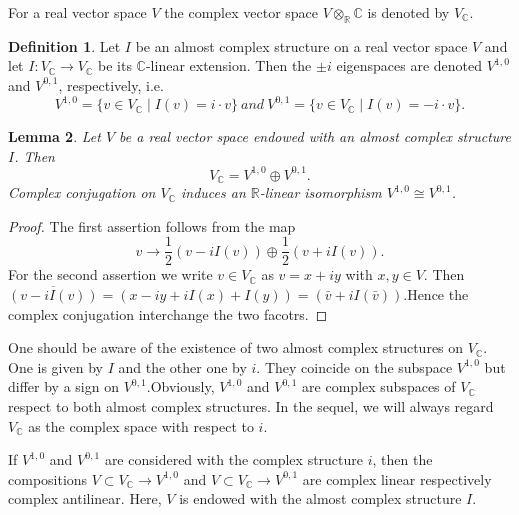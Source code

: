 \documentclass{article}
\theoremstyle{definition}
\newtheorem{definition}{Definition}[subsection]
\theoremstyle{plain}
\newtheorem{lemma}[definition]{Lemma}
\begin{document}
For a real vector space $ V $ the complex vector space $ V\otimes_{\mathbb{R}}\mathbb{C} $ is denoted by $ V_{\mathbb{C}} $.

\begin{definition}
    Let $ I $ be an almost complex structure on a real vector space $ V $ and let $ I:V_{\mathbb{C}} \rightarrow V_{\mathbb{C}} $ be its $ \mathbb{C} $-linear extension. Then the $ \pm i $ eigenspaces are denoted $ V^{1,0} $ and $ V^{0,1}  $, respectively, i.e.
    \[
        V^{1,0} =\{v\in V_{\mathbb{C}}\mid I(v)=i\cdot v\}\ and\ V^{0,1} =\{ v\in V_{\mathbb{C}}\mid I(v)=-i\cdot v\}.
    \]
\end{definition}

\begin{lemma}
    Let $ V $ be a real vector space endowed with an almost complex structure $ I $. Then 
    \[
        V_{\mathbb{C}} =V^{1,0} \oplus V^{0,1}.
    \] 
    Complex conjugation on $ V_{\mathbb{C}}  $ induces an $ \mathbb{R} $-linear isomorphism $ V^{1,0} \cong V^{0,1}  $.
\end{lemma}

\begin{proof}
    The first assertion follows from the map\[
        v\rightarrow \frac{1}{2}(v-iI(v))\oplus\frac{1}{2}(v+iI(v)).
    \] 
    For the second assertion we write $ v\in V_{\mathbb{C}}  $ as $ v=x+iy $ with $ x,y\in V $. Then $ \overline{(v-iI(v))}=(x-iy+iI(x)+I(y))=(\bar{v}+iI(\bar{v})) $.Hence the complex conjugation interchange the two facotrs.
\end{proof}

One should be aware of the existence of two almost complex structures on $ V_{\mathbb{C}} $. One is given by $ I $ and the other one by $ i $. They coincide on the subspace $ V^{1,0}  $ but differ by a sign on $ V^{0,1}  $.Obviously, $ V^{1,0}  $ and $ V^{0,1} $ are complex subspaces of $ V_{\mathbb{C}} $ respect to both almost complex structures. In the sequel, we will always regard $ V_{\mathbb{C}} $ as the complex space with respect to $ i $.

If $ V^{1,0} $ and $ V^{0,1} $ are considered with the complex structure $ i $, then the compositions $ V\subset V_{\mathbb{C}}\rightarrow V^{1,0} $ and $ V\subset V_{\mathbb{C}} \rightarrow V^{0,1} $ are complex linear respectively complex antilinear. Here, $ V $ is endowed with the almost complex structure $ I $.
\end{document}
